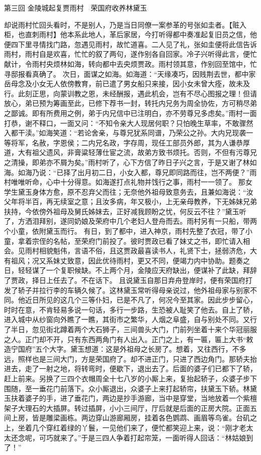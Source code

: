 \documentclass[12pt,oneside]{book}
\begin{document}
 
第三回  金陵城起复贾雨村　荣国府收养林黛玉

却说雨村忙回头看时，不是别人，乃是当日同僚一案参革的号张如圭者。【赃入柜，也直刺雨村】他本系此地人，革后家居，今打听得都中奏准起复旧员之信，他便四下里寻情找门路，忽遇见雨村，故忙道喜。二人见了礼，张如圭便将此信告诉雨村，雨村自是欢喜，忙忙的叙了两句，遂作别各自回家。冷子兴听得此言，便忙献计，令雨村央烦林如海，转向都中去央烦贾政。雨村领其意，作别回至馆中，忙寻邸报看真确了。
次日，面谋之如海。如海道：“天缘凑巧，因贱荆去世，都中家岳母念及小女无人依傍教育，前已遣了男女船只来接，因小女未曾大痊，故未及行。此刻正思，向蒙训教之恩，未经酬报，遇此机会，岂有不尽心图报之理！但请放心，弟已预为筹画至此，已修下荐书一封，转托内兄务为周全协佐，方可稍尽弟之鄙诚。即有所费用之例，弟于内兄信中已注明白，亦不劳尊兄多虑矣。”雨村一面打恭，谢不释口，一面又问：“不知令亲大人现居何职？只怕晚生草率，不敢骤然入都干渎。”如海笑道：“若论舍亲，与尊兄犹系同谱，乃荣公之孙。大内兄现袭一等将军，名赦，字恩侯；二内兄名政，字存周，现任工部员外郎，其为人谦恭厚道，大有祖父遗风，非膏粱轻薄仕宦之流，故弟方致书烦托。否则，不但有污尊兄之清操，即弟亦不屑为矣。”雨村听了，心下方信了昨日子兴之言，于是又谢了林如海。如海乃说：“已择了出月初二日，小女入都，尊兄即同路而往，岂不两便？”雨村唯唯听命，心中十分得意。如海遂打点礼物并饯行之事，雨村一一领了。
那女学生黛玉身体方愈，原不忍弃父而往；无奈他外祖母致意务去，且兼如海说：“汝父年将半百，再无续室之意；且汝多病，年又极小，上无亲母教养，下无姊妹兄弟扶持，今依傍外祖母及舅氏姊妹去，正好减我顾盼之忧，何反云不往？”黛玉听了，方洒泪拜别，遂同奶娘及荣府中几个老妇人登舟而去。雨村另有一只船，带两个小童，依附黛玉而行。
有日，到了都中，进入神京，雨村先整了衣冠，带了小童，拿着宗侄的名帖，至荣府门前投了。彼时贾政已看了妹丈之书，即忙请入相会。见雨村相貌魁伟，言语不俗，且这贾政最喜读书人，礼贤下士，拯弱济危，大有祖风；况又系妹丈致意，因此优待雨村，更又不同，便竭力内中协助。题奏之日，轻轻谋了一个复职候缺。不上两个月，金陵应天府缺出，便谋补了此缺，拜辞了贾政，择日上任去了。不在话下。
且说黛玉自那日弃舟登岸时，便有荣国府打发了轿子并拉行李的车辆久候了。这林黛玉常听得母亲说过，他外祖母家与别家不同。他近日所见的这几个三等仆妇，已是不凡了，何况今至其家。因此步步留心，时时在意，不肯轻易多说一句话，多行一步路，生恐被人耻笑了他去。自上了轿，进入城中从纱窗向外瞧了一瞧，其街市之繁华，人烟之阜盛，自与别处不同。又行了半日，忽见街北蹲着两个大石狮子，三间兽头大门，门前列坐着十来个华冠丽服之人。正门却不开，只有东西两角门有人出入。正门之上，有一匾，匾上大书“敕造宁国府”五个大字。黛玉想道：这是外祖母之长房了。想着，又往西行，不多远，照样也是三间大门，方是荣国府了。却不进正门，只进了西边角门。那轿夫抬进去，走了一射之地，将转弯时，便歇下，退出去了。后面的婆子们已都下了轿，赶上前来。另换了三四个衣帽周全十七八岁的小厮上来，复抬起轿子，众婆子步下围随，至一垂花门前落下。众小厮退出，众婆子上来打起轿帘，扶黛玉下轿。林黛玉扶着婆子的手，进了垂花门，两边是抄手游廊，当中是穿堂，当地放着一个紫檀架子大理石的大插屏。转过插屏，小小三间厅，厅后就是后面的正房大院。正面五间上房，皆是雕梁画栋。两边穿山游廊厢房，挂着各色鹦鹉、画眉等鸟雀。台矶之上，坐着几个穿红着绿的丫鬟，一见他们来了，便忙都笑迎上来，说：“刚才老太太还念呢，可巧就来了。”于是三四人争着打起帘笼，一面听得人回话：“林姑娘到了！”
\end{document}
